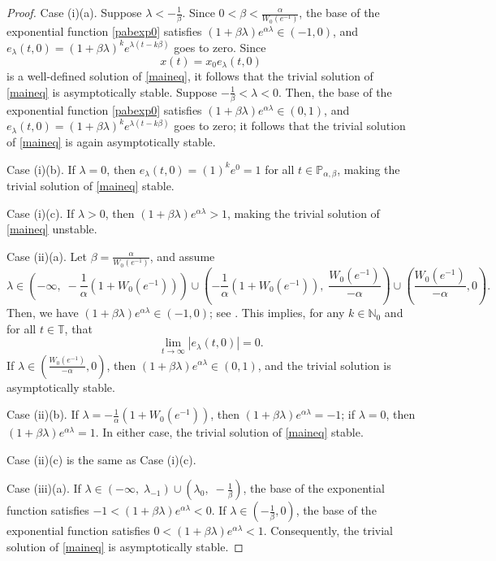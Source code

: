 \documentclass[12pt,reqno]{amsart}
\theoremstyle{plain}
\theoremstyle{definition}
\newcommand{\T}{\ensuremath{\mathbb{T}}}
\newcommand{\N}{\ensuremath{\mathbb{N}}}
\newcommand{\p}{\ensuremath{\mathbb{P}}}
\numberwithin{equation}{section}
\numberwithin{theorem}{section}
\begin{document}
\begin{proof}
Case (i)(a). Suppose $\lambda<-\frac{1}{\beta}$. Since $0<\beta<\frac{\alpha}{W_0(e^{-1})}$, the base of the exponential function \eqref{pabexp0} satisfies $(1+\beta\lambda)e^{\alpha\lambda}\in(-1,0)$, and $e_{\lambda}(t,0)=(1+\beta\lambda)^ke^{\lambda(t-k\beta)}$ goes to zero. Since 
$$ x(t) = x_0e_{\lambda}(t,0) $$
is a well-defined solution of \eqref{maineq}, it follows that the trivial solution of \eqref{maineq} is asymptotically stable. Suppose $-\frac{1}{\beta}<\lambda<0$. Then, the base of the exponential function \eqref{pabexp0} satisfies $(1+\beta\lambda)e^{\alpha\lambda}\in(0,1)$, and $e_{\lambda}(t,0)=(1+\beta\lambda)^ke^{\lambda(t-k\beta)}$ goes to zero; it follows that the trivial solution of \eqref{maineq} is again asymptotically stable.

Case (i)(b). If $\lambda=0$, then $e_{\lambda}(t,0)=(1)^ke^{0}=1$ for all $t\in\p_{\alpha,\beta}$, making the trivial solution of \eqref{maineq} stable.

Case (i)(c). If $\lambda>0$, then $(1+\beta\lambda)e^{\alpha\lambda}>1$, making the trivial solution of \eqref{maineq} unstable.

Case (ii)(a). Let $\beta=\frac{\alpha}{W_0(e^{-1})}$, and assume 
$$\lambda\in\left(-\infty,\; -\frac{1}{\alpha}\left(1+W_0(e^{-1})\right)\right)\cup\left(-\frac{1}{\alpha}\left(1+W_0(e^{-1})\right),\; \frac{W_0(e^{-1})}{-\alpha}\right)\cup\left(\frac{W_0(e^{-1})}{-\alpha},0\right).$$
Then, we have $(1+\beta\lambda)e^{\alpha\lambda}\in(-1,0)$; see \cite[p 7]{and}. This implies, for any $k\in\N_{0}$ and for all $t\in\T$, that
\[ \lim_{t\rightarrow\infty}|e_\lambda(t,0)|=0. \]
If $\lambda\in\left(\frac{W_0(e^{-1})}{-\alpha},0\right)$, then $(1+\beta\lambda)e^{\alpha\lambda}\in(0,1)$, and the trivial solution is asymptotically stable. 

Case (ii)(b). If $\lambda=-\frac{1}{\alpha}\left(1+W_0(e^{-1})\right)$, then $(1+\beta\lambda)e^{\alpha\lambda}=-1$; if $\lambda=0$, then $(1+\beta\lambda)e^{\alpha\lambda}=1$.  In either case, the trivial solution of \eqref{maineq} stable.

Case (ii)(c) is the same as Case (i)(c).

Case (iii)(a). If $\lambda\in\left(-\infty,\; \lambda_{-1}\right)\cup\left(\lambda_{0},\; -\frac{1}{\beta}\right)$, the base of the exponential function satisfies $-1<(1+\beta\lambda)e^{\alpha\lambda}<0$. If $\lambda\in\left(-\frac{1}{\beta},0\right)$, the base of the exponential function satisfies $0<(1+\beta\lambda)e^{\alpha\lambda}<1$. Consequently, the trivial solution of \eqref{maineq} is asymptotically stable.


\end{proof}
\end{document}
